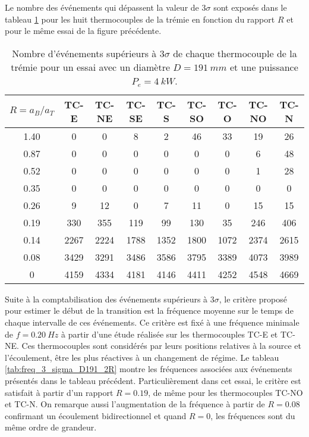 Le nombre des événements qui dépassent la valeur de $3\sigma$ sont exposés dans le tableau \ref{tab:event_3_sigma_D191_2R} pour les huit thermocouples de la trémie en fonction du rapport $R$ et pour le même essai de la figure précédente.

\begin{table}[H]
\centering
\caption{Nombre d'événements supérieurs à $3\sigma$ de chaque thermocouple de la trémie pour un essai avec un diamètre $D=\SI{191}{mm}$ et une puissance $P_e=\SI{4}{kW}$.}
\begin{tabular}{c c c c c c c c c}
\hline
$R=a_B/a_T$ & TC-E & TC-NE & TC-SE & TC-S & TC-SO & TC-O & TC-NO & TC-N \rule{0pt}{14pt}\\[0.5ex]
\hline
1.40 & 0 & 0 & 8 & 2 & 46 & 33 & 19 & 26 \\
0.87 & 0 & 0 & 0 & 0 & 0 & 0 & 6 & 48 \\
0.52 & 0 & 0 & 0 & 0 & 0 & 0 & 1 & 28 \\
0.35 & 0 & 0 & 0 & 0 & 0 & 0 & 0 & 0 \\
0.26 & 9 & 12 & 0 & 7 & 11 & 0 & 15 & 15 \\
0.19 & 330 & 355 & 119 & 99 & 130 & 35 & 246 & 406 \\
0.14 & 2267 & 2224 & 1788 & 1352 & 1800 & 1072 & 2374 & 2615 \\
0.08 & 3429 & 3291 & 3486 & 3586 & 3795 & 3389 & 4073 & 3989 \\
0 & 4159 & 4334 & 4181 & 4146 & 4411 & 4252 & 4548 & 4669 \\
\hline
\end{tabular}
\label{tab:event_3_sigma_D191_2R}
\end{table}

Suite à la comptabilisation des événements supérieurs à $3\sigma$, le critère proposé pour estimer le début de la transition est la fréquence moyenne sur le temps de chaque intervalle de ces événements. Ce critère est fixé à une fréquence minimale de $f=\SI{0.20}{Hz}$ à partir d'une étude réalisée sur les thermocouples TC-E et TC-NE. Ces thermocouples sont considérés par leurs positions relatives à la source et l'écoulement, être les plus réactives à un changement de régime. Le tableau \ref{tab:freq_3_sigma_D191_2R} montre les fréquences associées aux événements présentés dans le tableau précédent. Particulièrement dans cet essai, le critère est satisfait à partir d'un rapport $R=0.19$, de même pour les thermocouples TC-NO et TC-N. On remarque aussi l'augmentation de la fréquence à partir de $R=0.08$ confirmant un écoulement bidirectionnel et quand $R=0$, les fréquences sont du même ordre de grandeur. 

